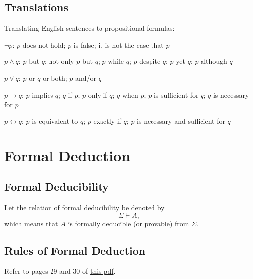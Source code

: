 \documentclass[11pt]{article}
\theoremstyle{definition}
\begin{document}
\subsection{Translations}
Translating English sentences to propositional formulas:

$\neg p$: $p$ does not hold; $p$ is false; it is not the case that $p$

$p \wedge q$: $p$ but $q$; not only $p$ but $q$; $p$ while $q$; $p$ despite $q$; $p$ yet $q$; $p$ although $q$

$p \vee q$: $p$ or $q$ or both; $p$ and/or $q$

$p \rightarrow q$: $p$ implies $q$; $q$ if $p$; $p$ only if $q$; $q$ when $p$; $p$ is sufficient for $q$; $q$ is necessary for $p$

$p \leftrightarrow q$: $p$ is equivalent to $q$; $p$ exactly if $q$; $p$ is necessary and sufficient for $q$

\newpage
\section{Formal Deduction}

\subsection{Formal Deducibility}
Let the relation of formal deducibility be denoted by
$$\Sigma \vdash A,$$
which means that $A$ is formally deducible (or provable) from $\Sigma$.

\subsection{Rules of Formal Deduction}
Refer to pages 29 and 30 of \href{https://cs.uwaterloo.ca/~a23gao/cs245_f19/notes/workbook_sol.pdf}{this pdf}.





\end{document}
